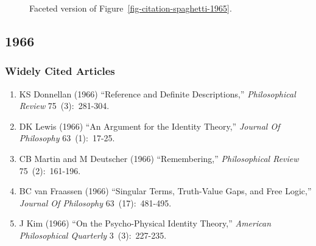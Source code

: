 \documentclass[
  10pt,
  letterpaper,
  DIV=11,
  numbers=noendperiod,
  twoside]{scrartcl}
\providecommand{\tightlist}{%
  \setlength{\itemsep}{0pt}\setlength{\parskip}{0pt}}\usepackage{longtable,booktabs,array}
\begin{document}
\begin{figure}


\caption{\label{fig-citation-facet-1965}Faceted version of
Figure~\ref{fig-citation-spaghetti-1965}.}

\end{figure}%

\newpage

\subsection{1966}\label{sec-s1966}

\subsubsection*{Widely Cited Articles}\label{widely-cited-articles-10}

\begin{enumerate}
\def\labelenumi{\arabic{enumi}.}
\tightlist
\item
  KS Donnellan (1966) ``Reference and Definite Descriptions,''
  \emph{Philosophical Review} 75~(3):~281-304.
\item
  DK Lewis (1966) ``An Argument for the Identity Theory,'' \emph{Journal
  Of Philosophy} 63~(1):~17-25.
\item
  CB Martin and M Deutscher (1966) ``Remembering,'' \emph{Philosophical
  Review} 75~(2):~161-196.
\item
  BC van Fraassen (1966) ``Singular Terms, Truth-Value Gaps, and Free
  Logic,'' \emph{Journal Of Philosophy} 63~(17):~481-495.
\item
  J Kim (1966) ``On the Psycho-Physical Identity Theory,''
  \emph{American Philosophical Quarterly} 3~(3):~227-235.
\end{enumerate}
\end{document}
